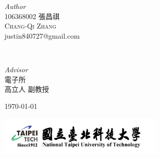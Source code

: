 \begin{titlepage}
	\begin{CJK}{UTF8}{bsmi}
		\begin{minipage}{0.4\textwidth}
			\begin{flushleft}
				\large
				\textit{Author}\\
				106368002 張昌祺\\ 
				\textsc{Chang-Qi Zhang} \\
				justin840727@gmail.com %
			\end{flushleft}
		\end{minipage}
		~
		\begin{minipage}{0.4\textwidth}
			\begin{flushright}
				\large
				\textit{Advisor}\\
				電子所 \\
				高立人 副教授 %
			\end{flushright}
		\end{minipage}
	\end{CJK}
					
					
	\vfill\vfill\vfill %
					
	{\large\today} %
					
					
	\vfill
	\includegraphics[width=0.6\textwidth]{../../logo.jpg}\\[1cm] %
						
									
									
	\end{titlepage}
